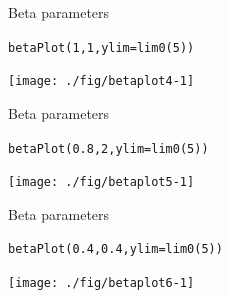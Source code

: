 \documentclass[xcolor=table,       handout,    xcolor=dvipsnames]{beamer}\usepackage[]{graphicx}\usepackage[]{color}
\makeatletter
\newcommand{\hlnum}[1]{\textcolor[rgb]{0,0,0}{#1}}
\newcommand{\hlstd}[1]{\textcolor[rgb]{0,0,0}{#1}}
\newcommand{\hlkwc}[1]{\textcolor[rgb]{1,0,1}{#1}}
\newcommand{\hlkwd}[1]{\textcolor[rgb]{0,0,1}{#1}}
\newenvironment{kframe}{%
 \def\at@end@of@kframe{}%
 \ifinner\ifhmode%
  \def\at@end@of@kframe{\end{minipage}}%
  \begin{minipage}{\columnwidth}%
 \fi\fi%
 \def\FrameCommand##1{\hskip\@totalleftmargin \hskip-\fboxsep
 \colorbox{shadecolor}{##1}\hskip-\fboxsep
     \hskip-\linewidth \hskip-\@totalleftmargin \hskip\columnwidth}%
 \MakeFramed {\advance\hsize-\width
   \@totalleftmargin\z@ \linewidth\hsize
   \@setminipage}}%
 {\par\unskip\endMakeFramed%
 \at@end@of@kframe}
\newenvironment{knitrout}{}{} %
\makeatother
\begin{document}

\begin{frame}[fragile]{Beta parameters}
\begin{knitrout}
\color{fgcolor}\begin{kframe}
\begin{alltt}
\hlkwd{betaPlot}\hlstd{(}\hlnum{1}\hlstd{,} \hlnum{1}\hlstd{,} \hlkwc{ylim}\hlstd{=}\hlkwd{lim0}\hlstd{(}\hlnum{5}\hlstd{))}
\end{alltt}
\end{kframe}

{\centering \texttt{[image: ./fig/betaplot4-1]} 

}



\end{knitrout}
\end{frame}


\begin{frame}[fragile]{Beta parameters}
\begin{knitrout}
\color{fgcolor}\begin{kframe}
\begin{alltt}
\hlkwd{betaPlot}\hlstd{(}\hlnum{0.8}\hlstd{,} \hlnum{2}\hlstd{,} \hlkwc{ylim}\hlstd{=}\hlkwd{lim0}\hlstd{(}\hlnum{5}\hlstd{))}
\end{alltt}
\end{kframe}

{\centering \texttt{[image: ./fig/betaplot5-1]} 

}



\end{knitrout}
\end{frame}


\begin{frame}[fragile]{Beta parameters}
\begin{knitrout}
\color{fgcolor}\begin{kframe}
\begin{alltt}
\hlkwd{betaPlot}\hlstd{(}\hlnum{0.4}\hlstd{,} \hlnum{0.4}\hlstd{,} \hlkwc{ylim}\hlstd{=}\hlkwd{lim0}\hlstd{(}\hlnum{5}\hlstd{))}
\end{alltt}
\end{kframe}

{\centering \texttt{[image: ./fig/betaplot6-1]} 

}



\end{knitrout}
\end{frame}
\end{document}
